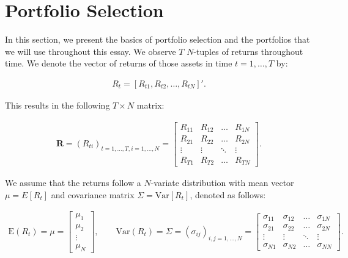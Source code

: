 \documentclass[12pt,oneside,a4paper]{memoir}
\begin{document}
\section{Portfolio Selection} \label{sec:ports:tp}

In this section, we present the basics of portfolio selection and the portfolios that we will use throughout this essay.
We observe $T$ $N$-tuples of returns throughout time.
We denote the vector of returns of those assets in time $t=1, \dots, T$ by:

\vspace{-18 pt}
\begin{align*} \label{retvec}
	R_{t} =  [R_{t1}, R_{t2} , \dots, R_{tN}]'.
\end{align*}

\noindent
This results in the following $T \times N$ matrix:

\vspace{-18 pt}
\begin{align*} \label{retmat}
	\mathbf{R} =  (R_{ti})_{t=1, \dots, T, i=1, \dots, N} = 
	\begin{bmatrix}
	R_{11} & R_{12} & \dots & R_{1N}
	\\
	R_{21} & R_{22} & \dots & R_{2N}
	\\
	\vdots & \vdots & \ddots & \vdots
	\\
	R_{T1} & R_{T2} & \dots & R_{TN}
\end{bmatrix}.
\end{align*}

\noindent
We assume that the returns follow a $N$-variate distribution with mean vector $\mu=E[R_{t}]$ and covariance matrix $\Sigma = \mathrm{Var}[R_{t}]$, denoted as follows:

\vspace{-18 pt}
\begin{align*}
\label{mu}
\mathrm{E}(R_{t})= \mu = 
\begin{bmatrix}
\mu_1 \\ \mu_2 \\ \vdots \\ \mu_N
\end{bmatrix},
\qquad
\label{covmat}
\mathrm{Var}(R_{t})=
\Sigma = ( \sigma_{ij} )_{i,j=1,\dots,N} = 
	\begin{bmatrix}
	\sigma_{11} & \sigma_{12} & \dots & \sigma_{1N}
	\\
	\sigma_{21} & \sigma_{22} & \dots & \sigma_{2N}
	\\
	\vdots           & \vdots            & \ddots & \vdots
	\\
	\sigma_{N1} & \sigma_{N2} & \dots & \sigma_{NN}
\end{bmatrix}.
\end{align*}
\end{document}
